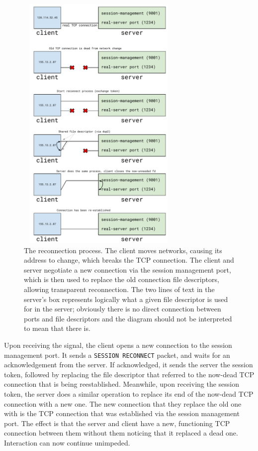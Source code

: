 \documentclass[twocolumn,11pt]{article}
\begin{document}
\begin{figure}
	\centering
	\includegraphics[width=80mm,height=127mm]{fig/reconn_diag}
	\caption{The reconnection process. The client moves networks, causing its
	address to change, which breaks the TCP connection. The client and server
	negotiate a new connection via the session management port, which is then
	used to replace the old connection file descriptors, allowing transparent
	reconnection. The two lines of text in the server's box represents logically
	what a given file descriptor is used for in the server; obviously there is
	no direct connection between ports and file descriptors and the diagram
	should not be interpreted to mean that there is.}
	\label{fig:recproc}
\end{figure}

Upon receiving the signal, the client opens a new connection to the session
management port. It sends a \texttt{SESSION RECONNECT} packet, and waits for an
acknowledgement from the server. If acknowledged, it sends the server the
session token, followed by replacing the file descriptor that referred to the
now-dead TCP connection that is being reestablished. Meanwhile, upon receiving
the session token, the server does a similar operation to replace its end of the
now-dead TCP connection with a new one. The new connection that they replace the
old one with is the TCP connection that was established via the session
management port. The effect is that the server and client have a new,
functioning TCP connection between them without them noticing that it replaced a
dead one. Interaction can now continue unimpeded.
\end{document}
